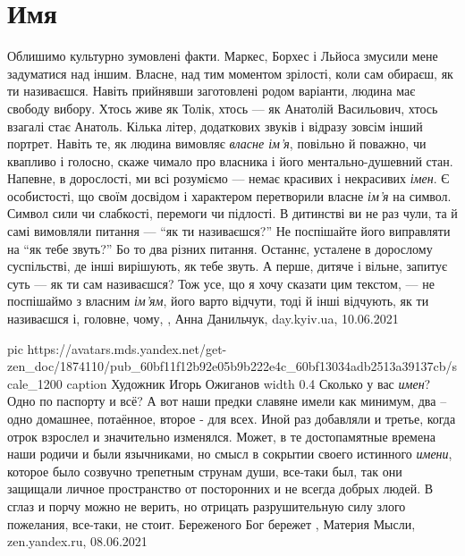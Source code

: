  
 
 
 
 
\chapter{Имя}
\label{sec:slova.imja}

Облишимо культурно зумовлені факти. Маркес, Борхес і Льйоса змусили мене
задуматися над іншим. Власне, над тим моментом зрілості, коли сам обираєш, як
ти називаєшся. Навіть прийнявши заготовлені родом варіанти, людина має свободу
вибору. Хтось живе як Толік, хтось — як Анатолій Васильович, хтось взагалі стає
Анатоль. Кілька літер, додаткових звуків і відразу зовсім інший портрет. Навіть
те, як людина вимовляє \emph{власне ім'я}, повільно й поважно, чи квапливо і голосно,
скаже чимало про власника і його ментально-душевний стан.  Напевне, в
дорослості, ми всі розуміємо — немає красивих і некрасивих \emph{імен}. Є особистості,
що своїм досвідом і характером перетворили власне \emph{ім’я} на символ. Символ сили
чи слабкості, перемоги чи підлості.  В дитинстві ви не раз чули, та й самі
вимовляли питання — \enquote{як ти називаєшся?} Не поспішайте його виправляти на \enquote{як
тебе звуть?} Бо то два різних питання. Останнє, усталене в дорослому
суспільстві, де інші вирішують, як тебе звуть. А перше, дитяче і вільне,
запитує суть — як ти сам називаєшся?  Тож усе, що я хочу сказати цим текстом, —
не поспішаймо з власним \emph{ім’ям},  його варто відчути, тоді й інші відчують, як ти
називаєшся і, головне, чому,
, Анна Данильчук, day.kyiv.ua, 10.06.2021


\ifcmt
  pic https://avatars.mds.yandex.net/get-zen_doc/1874110/pub_60bf11f12b92e05b9b222e4c_60bf13034adb2513a39137cb/scale_1200
	caption Художник Игорь Ожиганов
	width 0.4
\fi
Сколько у вас \emph{имен}? Одно по паспорту и всё? А вот наши предки славяне имели как
минимум, два – одно домашнее, потаённое, второе - для всех. Иной раз добавляли
и третье, когда отрок взрослел и значительно изменялся. Может, в те
достопамятные времена наши родичи и были язычниками, но смысл в сокрытии своего
истинного \emph{имени}, которое было созвучно трепетным струнам души, все-таки был,
так они защищали личное пространство от посторонних и не всегда добрых людей. В
сглаз и порчу можно не верить, но отрицать разрушительную силу злого пожелания,
все-таки, не стоит. Береженого Бог бережет
, 
Материя Мысли, zen.yandex.ru, 08.06.2021

